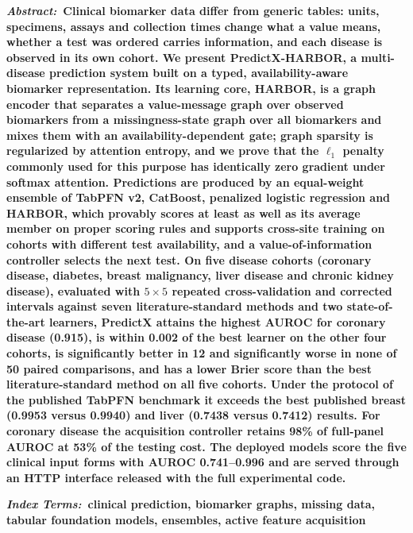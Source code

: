 
{\small\bfseries\noindent\textit{Abstract:}\ Clinical biomarker data differ from generic tables: units, specimens, assays and collection times change what a value means, whether a test was ordered carries information, and each disease is observed in its own cohort. We present PredictX-HARBOR, a multi-disease prediction system built on a typed, availability-aware biomarker representation. Its learning core, HARBOR, is a graph encoder that separates a value-message graph over observed biomarkers from a missingness-state graph over all biomarkers and mixes them with an availability-dependent gate; graph sparsity is regularized by attention entropy, and we prove that the $\ell_1$ penalty commonly used for this purpose has identically zero gradient under softmax attention. Predictions are produced by an equal-weight ensemble of TabPFN v2, CatBoost, penalized logistic regression and HARBOR, which provably scores at least as well as its average member on proper scoring rules and supports cross-site training on cohorts with different test availability, and a value-of-information controller selects the next test. On five disease cohorts (coronary disease, diabetes, breast malignancy, liver disease and chronic kidney disease), evaluated with $5\times5$ repeated cross-validation and corrected intervals against seven literature-standard methods and two state-of-the-art learners, PredictX attains the highest AUROC for coronary disease (0.915), is within 0.002 of the best learner on the other four cohorts, is significantly better in 12 and significantly worse in none of 50 paired comparisons, and has a lower Brier score than the best literature-standard method on all five cohorts. Under the protocol of the published TabPFN benchmark it exceeds the best published breast (0.9953 versus 0.9940) and liver (0.7438 versus 0.7412) results. For coronary disease the acquisition controller retains 98\% of full-panel AUROC at 53\% of the testing cost. The deployed models score the five clinical input forms with AUROC 0.741--0.996 and are served through an HTTP interface released with the full experimental code.\par}

\vspace{4pt}
{\small\bfseries\noindent\textit{Index Terms:}\ clinical prediction, biomarker graphs, missing data, tabular foundation models, ensembles, active feature acquisition\par}
